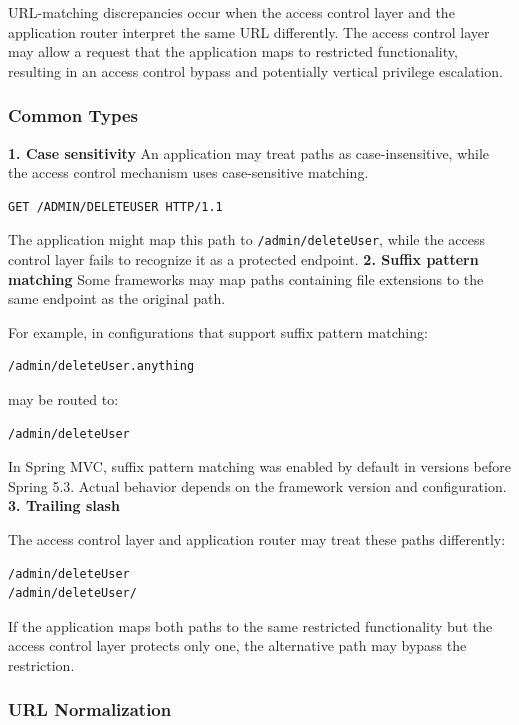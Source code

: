 \documentclass[11pt,a4paper]{article}
\begin{document}
URL-matching discrepancies occur when the access control layer and the application router interpret the same URL differently. The access control layer may allow a request that the application maps to restricted functionality, resulting in an access control bypass and potentially vertical privilege escalation.

\subsubsection{Common Types}

\textbf{1. Case sensitivity}
An application may treat paths as case-insensitive, while the access control mechanism uses case-sensitive matching.

\begin{lstlisting}[language=HTTP]
GET /ADMIN/DELETEUSER HTTP/1.1
\end{lstlisting}

The application might map this path to \texttt{/admin/deleteUser}, while the access control layer fails to recognize it as a protected endpoint.
\textbf{2. Suffix pattern matching}
Some frameworks may map paths containing file extensions to the same endpoint as the original path.

For example, in configurations that support suffix pattern matching:
\begin{lstlisting}
/admin/deleteUser.anything
\end{lstlisting}

may be routed to:
\begin{lstlisting}
/admin/deleteUser
\end{lstlisting}

In Spring MVC, suffix pattern matching was enabled by default in versions before Spring 5.3. Actual behavior depends on the framework version and configuration.
\textbf{3. Trailing slash}

The access control layer and application router may treat these paths differently:
\begin{lstlisting}
/admin/deleteUser
/admin/deleteUser/
\end{lstlisting}

If the application maps both paths to the same restricted functionality but the access control layer protects only one, the alternative path may bypass the restriction.

\subsubsection{URL Normalization}
\end{document}
